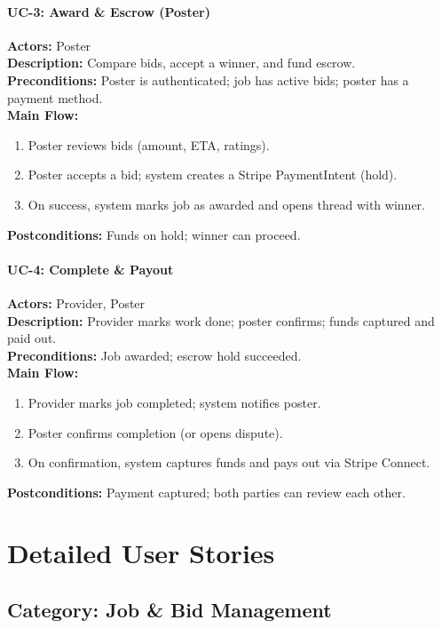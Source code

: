 \documentclass[11pt]{article}
\begin{document}
\paragraph{UC-3: Award \& Escrow (Poster)}
\textbf{Actors:} Poster\\
\textbf{Description:} Compare bids, accept a winner, and fund escrow.\\
\textbf{Preconditions:} Poster is authenticated; job has active bids; poster has a payment method.\\
\textbf{Main Flow:}
\begin{enumerate}[leftmargin=1.4em]
  \item Poster reviews bids (amount, ETA, ratings).
  \item Poster accepts a bid; system creates a Stripe PaymentIntent (hold).
  \item On success, system marks job as awarded and opens thread with winner.
\end{enumerate}
\textbf{Postconditions:} Funds on hold; winner can proceed.

\paragraph{UC-4: Complete \& Payout}
\textbf{Actors:} Provider, Poster\\
\textbf{Description:} Provider marks work done; poster confirms; funds captured and paid out.\\
\textbf{Preconditions:} Job awarded; escrow hold succeeded.\\
\textbf{Main Flow:}
\begin{enumerate}[leftmargin=1.4em]
  \item Provider marks job completed; system notifies poster.
  \item Poster confirms completion (or opens dispute).
  \item On confirmation, system captures funds and pays out via Stripe Connect.
\end{enumerate}
\textbf{Postconditions:} Payment captured; both parties can review each other.

\section{Detailed User Stories}

\subsection*{Category: Job \& Bid Management}
\end{document}
